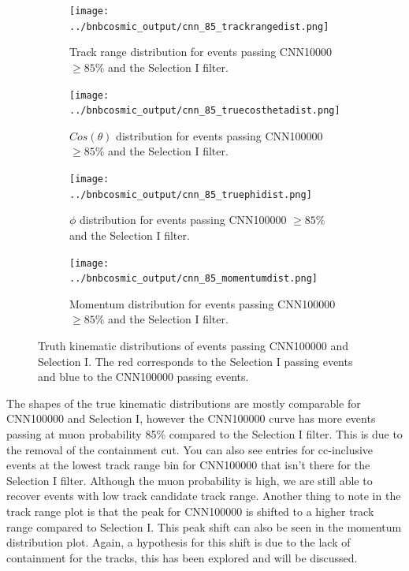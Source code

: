 \begin{figure}[htp!]
\centering
	\begin{subfigure}[b]{.475\textwidth}
	\centering
		\texttt{[image: ../bnbcosmic\_output/cnn\_85\_trackrangedist.png]}
		\caption{Track range distribution for events passing CNN10000 $\geq 85\%$ and the Selection I filter.} 
		\label{fig:cnn85trackrange}
	\end{subfigure}
	\quad
	\begin{subfigure}[b]{.475\textwidth}
	\centering
		\texttt{[image: ../bnbcosmic\_output/cnn\_85\_truecosthetadist.png]}
		\caption{$Cos(\theta)$ distribution for events passing CNN100000 $\geq 85\%$ and the Selection I filter.} 
		\label{fig:cnn85costheta}
	\end{subfigure}
	\quad
	\begin{subfigure}[b]{.475\textwidth}
	\centering
		\texttt{[image: ../bnbcosmic\_output/cnn\_85\_truephidist.png]}
		\caption{$\phi$ distribution for events passing CNN100000 $\geq 85\%$ and the Selection I filter.} 
		\label{fig:cnn85phi}
	\end{subfigure}
	\quad
	\begin{subfigure}[b]{.475\textwidth}
	\centering
		\texttt{[image: ../bnbcosmic\_output/cnn\_85\_momentumdist.png]}
		\caption{Momentum distribution for events passing CNN100000 $\geq 85 \%$ and the Selection I filter.} 
		\label{fig:cnn85momentum}
	\end{subfigure}
\caption{Truth kinematic distributions of events passing CNN100000 and Selection I. The red corresponds to the Selection I passing events and blue to the CNN100000 passing events.}
\label{fig:truthkinematics}
\end{figure}

The shapes of the true kinematic distributions are mostly comparable for CNN100000 and Selection I, however the CNN100000 curve has more events passing at muon probability 85\% compared to the Selection I filter. This is due to the removal of the containment cut. You can also see entries for cc-inclusive events at the lowest track range bin for CNN100000 that isn't there for the Selection I filter. Although the muon probability is high, we are still able to recover events with low track candidate track range. Another thing to note in the track range plot is that the peak for CNN100000 is shifted to a higher track range compared to Selection I. This peak shift can also be seen in the momentum distribution plot. Again, a hypothesis for this shift is due to the lack of containment for the tracks, this has been explored and will be discussed. 

